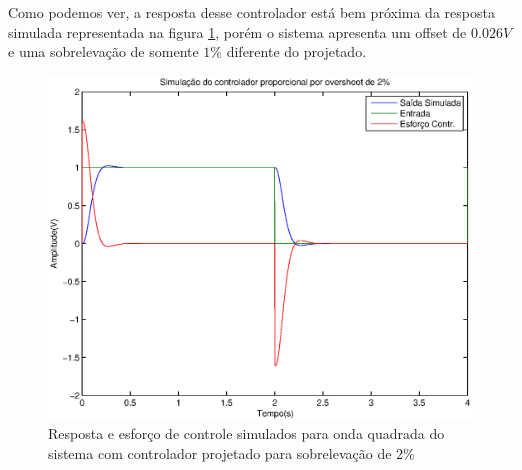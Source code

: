 \documentclass{article}
\begin{document}
  Como podemos ver, a resposta desse controlador está bem próxima da resposta simulada representada na figura \ref{fig:simpidv}, porém o sistema apresenta um offset de $0.026 V$ e uma sobrelevação de somente $1\%$ diferente do projetado.
  \begin{figure}[H]
  	\centering
  	\includegraphics[width=0.8\linewidth]{yusimpidv}
  	\caption{Resposta e esforço de controle simulados para onda quadrada do sistema com controlador projetado para sobrelevação de $2\%$}
  	\label{fig:simpidv}
  \end{figure}
  
\end{document}
